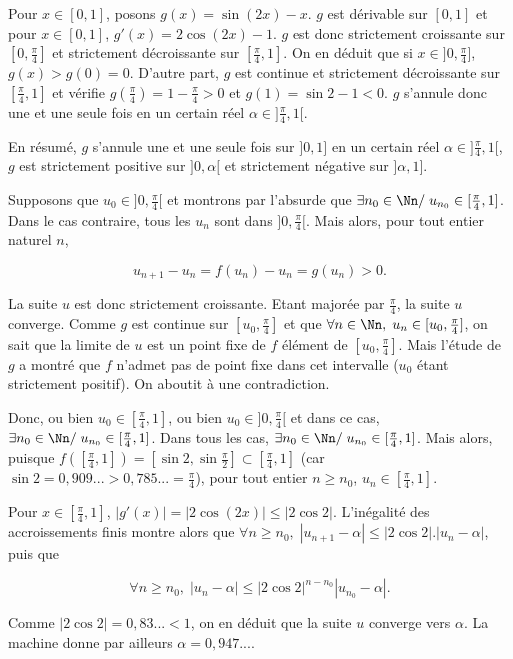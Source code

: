 {{\begin{enumerate}
Pour $x\in[0,1]$, posons $g(x)=\sin(2x)-x$. $g$ est dérivable sur $[0,1]$ et pour $x\in[0,1]$, $g'(x)=2\cos(2x)-1$. $g$ est donc strictement croissante sur $[0,\frac{\pi}{4}]$ et strictement décroissante sur $[\frac{\pi}{4},1]$. On en déduit que si $x\in]0,\frac{\pi}{4}]$, $g(x)>g(0)=0$. D'autre part, $g$ est continue et strictement décroissante sur $[\frac{\pi}{4},1]$ et vérifie $g(\frac{\pi}{4})=1-\frac{\pi}{4}>0$ et $g(1)=\sin2-1<0$. $g$ s'annule donc une et une seule fois en un certain réel $\alpha\in]\frac{\pi}{4},1[$.

En résumé, $g$ s'annule une et une seule fois sur $]0,1]$ en un certain réel $\alpha\in]\frac{\pi}{4},1[$, $g$ est strictement positive sur $]0,\alpha[$ et strictement négative sur $]\alpha,1]$.

Supposons que $u_0\in]0,\frac{\pi}{4}[$ et montrons par l'absurde que $\exists n_0\in\Nn/\;u_{n_0}\in[\frac{\pi}{4},1]$. Dans le cas contraire, tous les $u_n$ sont dans $]0,\frac{\pi}{4}[$. Mais alors, pour tout entier naturel $n$,

$$u_{n+1}-u_n=f(u_n)-u_n=g(u_n)>0.$$

La suite $u$ est donc strictement croissante. Etant majorée par $\frac{\pi}{4}$, la suite $u$ converge. Comme $g$ est continue sur $[u_0,\frac{\pi}{4}]$ et que $\forall n\in\Nn,\;u_n\in[u_0,\frac{\pi}{4}]$, on sait que la limite de $u$ est un point fixe de $f$ élément de $[u_0,\frac{\pi}{4}]$. Mais l'étude de $g$ a montré que $f$ n'admet pas de point fixe dans cet intervalle ($u_0$ étant strictement positif). On aboutit à une contradiction.

Donc, ou bien $u_0\in[\frac{\pi}{4},1]$, ou bien $u_0\in]0,\frac{\pi}{4}[$ et dans ce cas, $\exists n_0\in\Nn/\;u_{n_0}\in[\frac{\pi}{4},1]$. Dans tous les cas, $\exists n_0\in\Nn/\;u_{n_0}\in[\frac{\pi}{4},1]$. Mais alors, puisque $f([\frac{\pi}{4},1])=[\sin2,\sin\frac{\pi}{2}]\subset[\frac{\pi}{4},1]$ (car $\sin2=0,909...>0,785...=\frac{\pi}{4}$), pour tout entier $n\geq n_0$, $u_n\in[\frac{\pi}{4},1]$.

Pour $x\in[\frac{\pi}{4},1]$, $|g'(x)|=|2\cos(2x)|\leq|2\cos2|$. L'inégalité des accroissements finis montre alors que $\forall n\geq n_0,\;|u_{n+1}-\alpha|\leq|2\cos2|.|u_n-\alpha|$, puis que 

$$\forall n\geq n_0,\;|u_n-\alpha|\leq|2\cos2|^{n-n_0}|u_{n_0}-\alpha|.$$

Comme $|2\cos2|=0,83...<1$, on en déduit que la suite $u$ converge vers $\alpha$. La machine donne par ailleurs $\alpha=0,947...$.


\end{enumerate}}}
